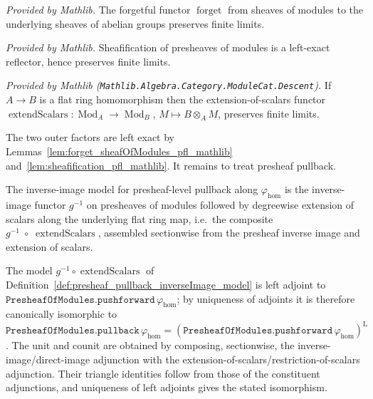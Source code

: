\begin{lemma}
  \label{lem:forget_sheafOfModules_pfl_mathlib}
  \mathlibok
  \textit{Provided by Mathlib.}
  The forgetful functor \(\operatorname{forget}\) from sheaves of modules to the
  underlying sheaves of abelian groups preserves finite limits.
\end{lemma}

\begin{lemma}
  \label{lem:sheafification_pfl_mathlib}
  \mathlibok
  \textit{Provided by Mathlib.}
  Sheafification of presheaves of modules is a left-exact reflector, hence preserves
  finite limits.
\end{lemma}

\begin{lemma}
  \label{lem:extendScalars_pfl_flat_mathlib}
  \mathlibok
  \textit{Provided by Mathlib (\texttt{Mathlib.Algebra.Category.ModuleCat.Descent}).}
  If \(A \to B\) is a flat ring homomorphism then the extension-of-scalars functor
  \(\operatorname{extendScalars} : \operatorname{Mod}_A \to \operatorname{Mod}_B\),
  \(M \mapsto B \otimes_A M\), preserves finite limits.
\end{lemma}

The two outer factors are left exact by
Lemmas~\ref{lem:forget_sheafOfModules_pfl_mathlib}
and~\ref{lem:sheafification_pfl_mathlib}. It remains to treat presheaf pullback.

\begin{definition}
  \label{def:presheaf_pullback_inverseImage_model}
  The inverse-image model for presheaf-level pullback along \(\varphi_{\mathrm{hom}}\) is
  the inverse-image functor \(g^{-1}\) on presheaves of modules followed by degreewise
  extension of scalars along the underlying flat ring map, i.e.\ the composite
  \(g^{-1} \;\circ\; \operatorname{extendScalars}\), assembled sectionwise from the
  presheaf inverse image and extension of scalars.
\end{definition}

\begin{lemma}
  \label{lem:presheaf_pullback_inverseImage_adjoint}
  The model \(g^{-1} \circ \operatorname{extendScalars}\) of
  Definition~\ref{def:presheaf_pullback_inverseImage_model} is left adjoint to
  \(\texttt{PresheafOfModules.pushforward}\,\varphi_{\mathrm{hom}}\); by uniqueness of
  adjoints it is therefore canonically isomorphic to
  \(\texttt{PresheafOfModules.pullback}\,\varphi_{\mathrm{hom}}
  = (\texttt{PresheafOfModules.pushforward}\,\varphi_{\mathrm{hom}})^{\mathrm{L}}\).
  The unit and counit are obtained by composing, sectionwise, the
  inverse-image/direct-image adjunction with the extension-of-scalars/restriction-of-scalars
  adjunction. Their triangle identities follow from those of the constituent
  adjunctions, and uniqueness of left adjoints gives the stated isomorphism.
\end{lemma}

